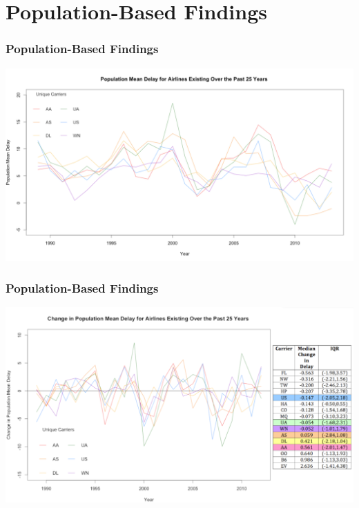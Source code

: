 \documentclass{beamer}
\begin{document}
\section{Population-Based Findings}
\begin{frame}
\frametitle{Population-Based Findings}
\begin{center} 
\includegraphics[width=1 \textwidth]{popMean}
\end{center}

\end{frame}

\begin{frame}
\frametitle{Population-Based Findings}
\begin{center} 
\includegraphics[width=1 \textwidth]{popPlot}
\end{center}

\end{frame}
\end{document}
